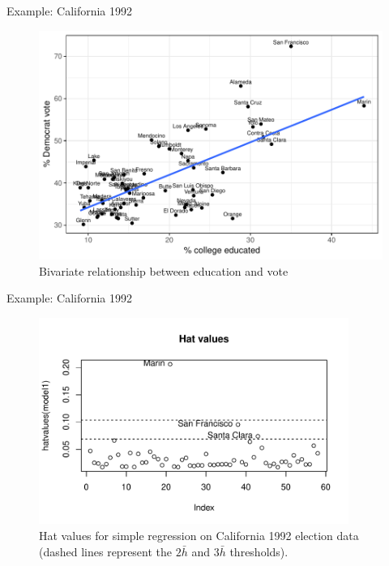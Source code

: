 \documentclass[12pt,english,pdf,xcolor=dvipsnames,aspectratio=169,handout]{beamer}\usepackage[]{graphicx}\usepackage[]{xcolor}
\begin{document}
\begin{frame}{Example: California 1992}

\begin{figure}
\includegraphics[scale=0.65]{../04-graphs/05-01}
\caption{Bivariate relationship between education and vote}
\end{figure}

\end{frame}




\begin{frame}{Example: California 1992}



\begin{figure}
  \centering
  \includegraphics[width=0.9\textwidth]{../04-graphs/05-02.pdf}
  \caption{\label{fig:fig-01} Hat values for simple regression on California 1992 election data (dashed lines represent the $2\bar{h}$ and $3\bar{h}$ thresholds).}
\end{figure}

\end{frame}
\end{document}
